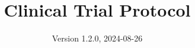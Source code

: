 \documentclass[
]{scrartcl}
\title{Clinical Trial Protocol}
\subtitle{ADVANCE TRAUMA\\
\strut \\
Effects of Advanced Trauma Life Support\textsuperscript{®} Training
Compared to Standard Care on Adult Trauma Patient Outcomes: A Cluster
Randomised Trial}
\author{Version 1.2.0, 2024-08-26}
\date{}
\begin{document}


\begin{titlepage}


\newcommand{\titlepagepagealign}{
\ifthenelse{\equal{center}{right}}{\raggedleft}{}
\ifthenelse{\equal{center}{center}}{\centering}{}
\ifthenelse{\equal{center}{left}}{\raggedright}{}
}


\newcommand{\titleandsubtitle}{
{\fontsize{15}{18.0}\selectfont
{\uppercase{\nohyphens{Clinical Trial Protocol}}}\par
}%

\vspace{\betweentitlesubtitle}
{
\fontsize{20}{24.0}\selectfont
{\bfseries{\nohyphens{ADVANCE TRAUMA\\
\strut \\
Effects of Advanced Trauma Life Support\textsuperscript{®} Training
Compared to Standard Care on Adult Trauma Patient Outcomes: A Cluster
Randomised Trial}}}\par
}}
\newcommand{\titlepagetitleblock}{
\rule{\textwidth}{0.4pt} %
\vspace{0.025\textheight} %

\titleandsubtitle

\vspace{0.025\textheight} 
\rule{0.3\textwidth}{0.4pt} %
}
\newcommand{\authorstyle}[1]{{\Large{#1}}}

\newcommand{\affiliationstyle}[1]{{\large{#1}}}

\newcommand{\titlepageauthorblock}{
{\authorstyle{\nohyphens{Version 1.2.0, 2024-08-26}\\}}
}

\newcommand{\titlepageaffiliationblock}{
\hangindent=1em
\hangafter=1
{\affiliationstyle{


\vspace{1\baselineskip} 
}}
}
\newcommand{\headerstyled}{%
{}
}
\newcommand{\footerstyled}{%
{\large{\textsc{}}}
}
\newcommand{\datestyled}{%
{}
}


\newcommand{\titlepageheaderblock}{\headerstyled}

\newcommand{\titlepagefooterblock}{
\footerstyled
}

\newcommand{\titlepagedateblock}{
\datestyled
}

\newcommand{\titleblock}{\newlength{\betweentitlesubtitle}
\setlength{\betweentitlesubtitle}{\baselineskip}
{

}}
\end{titlepage}
\end{document}
